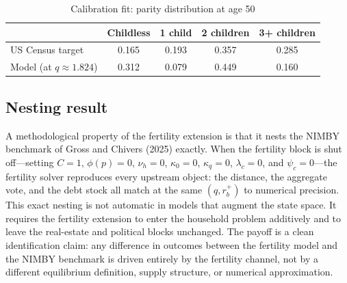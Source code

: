 \begin{table}[htbp]
\centering
\caption{Calibration fit: parity distribution at age 50}
\label{tab:calibration_fit}
\small
\begin{tabular}{l cccc}
\toprule
 & Childless & 1 child & 2 children & 3+ children \\
\midrule
US Census target & 0.165 & 0.193 & 0.357 & 0.285 \\
Model (at $q \approx 1.824$) & 0.312 & 0.079 & 0.449 & 0.160 \\
\bottomrule
\end{tabular}
\end{table}

\subsection{Nesting result}

A methodological property of the fertility extension is that it nests the NIMBY benchmark of Gross and Chivers (2025) exactly. When the fertility block is shut off---setting $C = 1$, $\phi(p) = 0$, $\nu_h = 0$, $\kappa_0 = 0$, $\kappa_q = 0$, $\lambda_c = 0$, and $\psi_c = 0$---the fertility solver reproduces every upstream object: the distance, the aggregate vote, and the debt stock all match at the same $(q, r_b^{+})$ to numerical precision. This exact nesting is not automatic in models that augment the state space. It requires the fertility extension to enter the household problem additively and to leave the real-estate and political blocks unchanged. The payoff is a clean identification claim: any difference in outcomes between the fertility model and the NIMBY benchmark is driven entirely by the fertility channel, not by a different equilibrium definition, supply structure, or numerical approximation.
